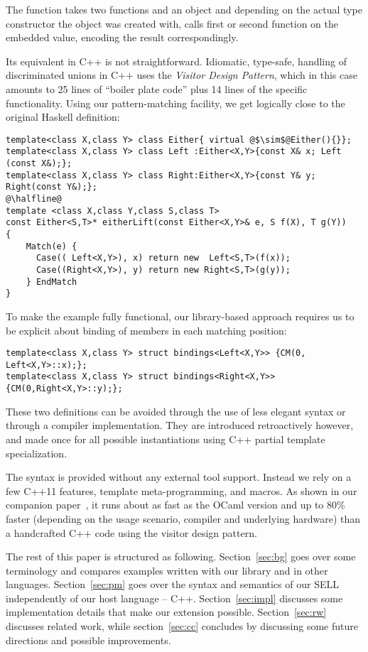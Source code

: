 \noindent
The function  takes two functions and an 
object and depending on the actual type constructor the object was created with, 
calls first or second function on the embedded value, encoding the result 
correspondingly.

Its equivalent in C++ is not straightforward. Idiomatic, type-safe, handling of 
discriminated unions in C++ uses the \emph{Visitor Design Pattern}\cite{DesignPatterns}, 
which in this case amounts to 25 lines of ``boiler plate code'' plus 14 lines 
of the specific functionality. Using our 
pattern-matching facility, we get logically close to the original Haskell definition:

\begin{lstlisting}[keepspaces,columns=flexible]
template<class X,class Y> class Either{ virtual @$\sim$@Either(){}};
template<class X,class Y> class Left :Either<X,Y>{const X& x; Left (const X&);};
template<class X,class Y> class Right:Either<X,Y>{const Y& y; Right(const Y&);};
@\halfline@
template <class X,class Y,class S,class T>
const Either<S,T>* eitherLift(const Either<X,Y>& e, S f(X), T g(Y))
{
    Match(e) {
      Case(( Left<X,Y>), x) return new  Left<S,T>(f(x));
      Case((Right<X,Y>), y) return new Right<S,T>(g(y));
    } EndMatch
}
\end{lstlisting}

\noindent
To make the example fully functional, our library-based approach requires us to 
be explicit about binding of members in each matching position:

\begin{lstlisting}[keepspaces,columns=flexible]
template<class X,class Y> struct bindings<Left<X,Y>> {CM(0, Left<X,Y>::x);};
template<class X,class Y> struct bindings<Right<X,Y>>{CM(0,Right<X,Y>::y);};
\end{lstlisting}

\noindent
These two definitions can be avoided through the use of less elegant syntax
or through a compiler implementation.
They are introduced retroactively however, and made once for all 
possible instantiations using C++ partial template specialization. 

The syntax is provided without any external tool support. Instead we rely on a 
few C++11 features\cite{C++11}, template meta-programming, and macros. As shown 
in our companion paper~\cite{TypeSwitch}, it runs about as fast as the OCaml 
version and up to 80\% faster (depending on the usage scenario, compiler and 
underlying hardware) than a handcrafted C++ code using the visitor 
design pattern.

The rest of this paper is structured as following. Section~\ref{sec:bg} goes 
over some terminology and compares examples written with our library and in 
other languages. Section~\ref{sec:pm} goes over the syntax and semantics of our 
SELL independently of our host language -- C++. Section~\ref{sec:impl} discusses 
some implementation details that make our extension possible. 
Section~\ref{sec:rw} discusses related work, while section~\ref{sec:cc} 
concludes by discussing some future directions and possible improvements.
